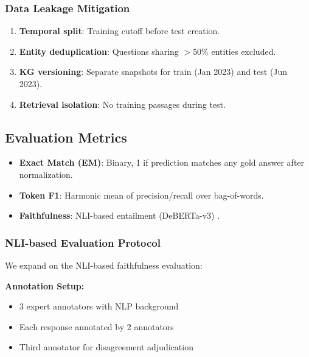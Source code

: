 \documentclass[10pt,twocolumn]{article}
\begin{document}
\subsubsection{Data Leakage Mitigation}
\label{sec:leakage}
\begin{enumerate}
    \item \textbf{Temporal split}: Training cutoff before test creation.
    \item \textbf{Entity deduplication}: Questions sharing $>$50\% entities excluded.
    \item \textbf{KG versioning}: Separate snapshots for train (Jan 2023) and test (Jun 2023).
    \item \textbf{Retrieval isolation}: No training passages during test.
\end{enumerate}

\subsection{Evaluation Metrics}

\begin{itemize}
    \item \textbf{Exact Match (EM)}: Binary, 1 if prediction matches any gold answer after normalization.
    \item \textbf{Token F1}: Harmonic mean of precision/recall over bag-of-words.
    \item \textbf{Faithfulness}: NLI-based entailment (DeBERTa-v3) \cite{he2021deberta}.
\end{itemize}


\subsubsection{NLI-based Evaluation Protocol}
\label{sec:nli_protocol}

We expand on the NLI-based faithfulness evaluation:

\textbf{Annotation Setup:}
\begin{itemize}
    \item 3 expert annotators with NLP background
    \item Each response annotated by 2 annotators
    \item Third annotator for disagreement adjudication
\end{itemize}
\end{document}
